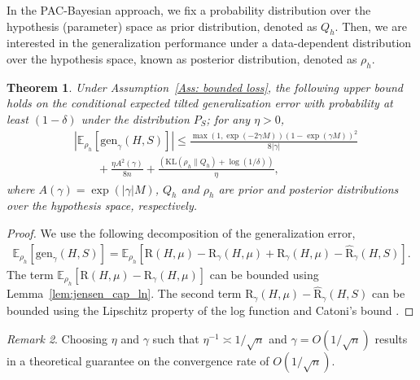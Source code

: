 \documentclass{article}
\theoremstyle{plain}
\theoremstyle{plain}
\newtheorem{theorem}{Theorem}[section]
\theoremstyle{definition}
\theoremstyle{remark}
\newtheorem{remark}[theorem]{Remark}
\newcommand{\RTERM}{\widehat{\mathrm{R}}_{\gamma}}
\newcommand{\RTrue}{\mathrm{R}}
\newcommand{\RTET}{\mathrm{R}_{\gamma}}
\newcommand{\KLr}{\mathrm{KL}}
\newcommand{\mbE}{\mathbb{E}}
\begin{document}
In the PAC-Bayesian approach, we fix a probability distribution over the hypothesis (parameter) space as prior distribution, denoted as $Q_h$. Then, we are interested in the generalization performance under a data-dependent distribution over the hypothesis space, known as posterior distribution, denoted as $\rho_h$.
\begin{tcolorbox}
    \begin{theorem}\label{thm: pac bound}
    Under Assumption~\ref{Ass: bounded loss}, the following upper bound holds on the conditional expected tilted generalization error with probability at least $(1-\delta)$ under the distribution $P_S$; for any $\eta>0$,
    \begin{equation}
        \begin{split}
            &|\mbE_{\rho_{h}}[\mathrm{gen}_{\gamma}(H,S)]|\leq  \frac{\max(1,\exp(-2\gamma M))(1-\exp(\gamma M))^2}{8|\gamma|} \\&\qquad+ \frac{\eta A^2(\gamma) }{8n} + \frac{(\KLr(\rho_h\|Q_h)+\log(1/\delta))}{\eta},
        \end{split}
    \end{equation}
    where $A(\gamma)=\exp(|\gamma|M)$,  $Q_h$ and $\rho_h$ are prior and posterior distributions over the hypothesis space, respectively.
\end{theorem}
\end{tcolorbox}

\begin{proof}
   We use the following decomposition of the generalization error,
   \[\begin{split}
     \mbE_{\rho_{h}}[\mathrm{gen}_{\gamma}(H,S)]= \mbE_{\rho_h}[\RTrue(H,\mu)-\RTET(H,\mu)+\RTET(H,\mu)-\RTERM(H,S)].
   \end{split}
   \]
   The term $ \mbE_{\rho_h}[\RTrue(H,\mu)-\RTET(H,\mu)]$ can be bounded using Lemma~\ref{lem:jensen_cap_ln}. The second term $\RTET(H,\mu)-\RTERM(H,S)$ can be bounded using the Lipschitz property  of the log function and Catoni's bound \citep{catoni2003pac}.
\end{proof}

\begin{remark}
    Choosing $\eta$ and $\gamma$ such that $\eta^{-1} \asymp 1/\sqrt{n}$ 
    and $\gamma=O(1/\sqrt{n})$ results in a theoretical guarantee on the convergence rate of $O(1/\sqrt{n})$.
\end{remark} 




\end{document}
